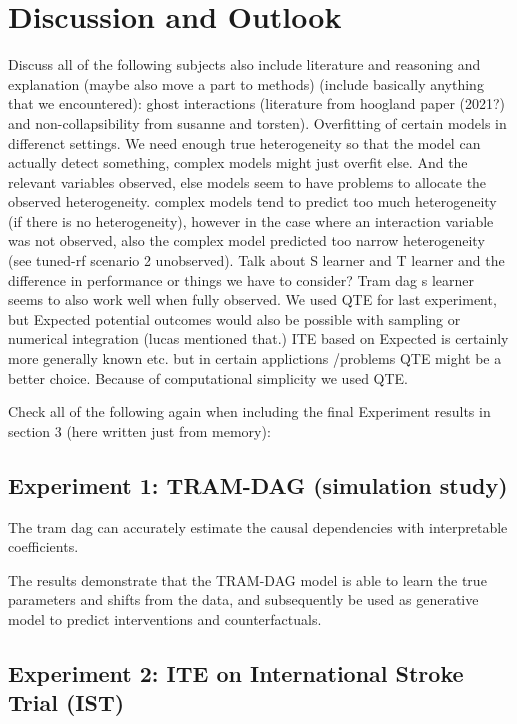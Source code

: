 

\chapter{Discussion and Outlook}


Discuss all of the following subjects also include literature and reasoning and explanation (maybe also move a part to methods) (include basically anything that we encountered): ghost interactions (literature from hoogland paper (2021?) and non-collapsibility from susanne and torsten). Overfitting of certain models in differenct settings. We need enough true heterogeneity so that the model can actually detect something, complex models might just overfit else. And the relevant variables observed, else models seem to have problems to allocate the observed heterogeneity. complex models tend to predict too much heterogeneity (if there is no heterogeneity), however in the case where an interaction variable was not observed, also the complex model predicted too narrow heterogeneity (see tuned-rf scenario 2 unobserved). Talk about S learner and T learner and the difference in performance or things we have to consider? Tram dag s learner seems to also work well when fully observed. We used QTE for last experiment, but Expected potential outcomes would also be possible with sampling or numerical integration (lucas mentioned that.) ITE based on Expected is certainly more generally known etc. but in certain applictions /problems QTE might be a better choice. Because of computational simplicity we used QTE.



Check all of the following again when including the final Experiment results in section 3 (here written just from memory):


\section{Experiment 1: TRAM-DAG (simulation study)}

The tram dag can accurately estimate the causal dependencies with interpretable coefficients.

The results demonstrate that the TRAM-DAG model is able to learn the true parameters and shifts from the data, and subsequently be used as generative model to predict interventions and counterfactuals.


\section{Experiment 2: ITE on International Stroke Trial (IST)}

